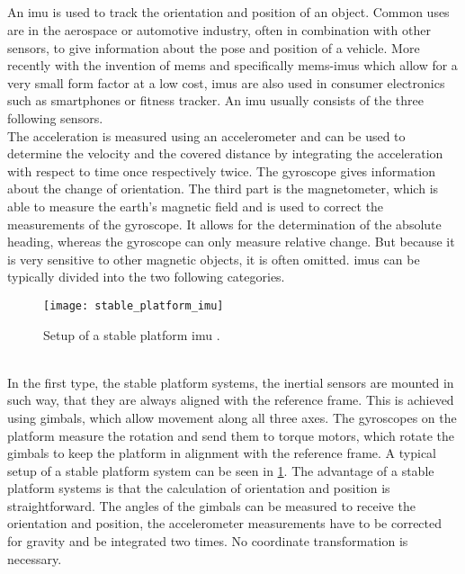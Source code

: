 \subsection{}
An \gls{imu} is used to track the orientation and position of an object.
Common uses are in the aerospace or automotive industry, often in combination with other sensors, to give information about the pose and position of a vehicle.
More recently with the invention of \gls{mems} and specifically \gls{mems}-\glspl{imu} which allow for a very small form factor at a low cost, \glspl{imu} are also used in consumer electronics such as smartphones or fitness tracker.
An \gls{imu} usually consists of the three following sensors.\\
The acceleration is measured using an accelerometer and can be used to determine the velocity and the covered distance by integrating the acceleration with respect to time once respectively twice.
The gyroscope gives information about the change of orientation.
The third part is the magnetometer, which is able to measure the earth's magnetic field and is used to correct the measurements of the gyroscope.
It allows for the determination of the absolute heading, whereas the gyroscope can only measure relative change. But because it is very sensitive to other magnetic objects, it is often omitted.
\glspl{imu} can be typically divided into the two following categories.
\begin{figure}[h]
	\centering
	\texttt{[image: stable\_platform\_imu]}
	\caption[Setup of a stable platform \acrshort{imu}]{Setup of a stable platform \acrshort{imu} \cite{Woodman2007}.}
	\label{fig:stable_platform_imu}
\end{figure}
\\In the first type, the stable platform systems, the inertial sensors are mounted in such way, that they are always aligned with the reference frame.
This is achieved using gimbals, which allow movement along all three axes.
The gyroscopes on the platform measure the rotation and send them to torque motors, which rotate the gimbals to keep the platform in alignment with the reference frame.
A typical setup of a stable platform system can be seen in \cref{fig:stable_platform_imu}.
The advantage of a stable platform systems is that the calculation of orientation and position is straightforward.
The angles of the gimbals can be measured to receive the orientation and position, the accelerometer measurements have to be corrected for gravity and be integrated two times.
No coordinate transformation is necessary.
